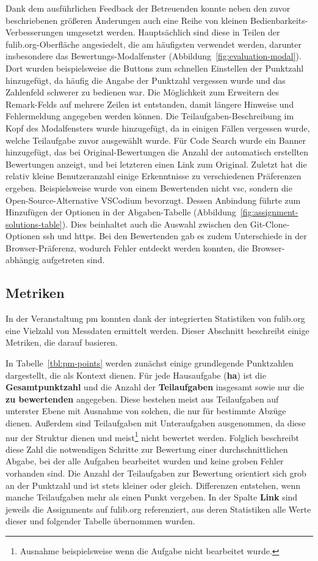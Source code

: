 Dank dem ausführlichen Feedback der Betreuenden konnte neben den zuvor beschriebenen größeren Änderungen auch eine Reihe von kleinen Bedienbarkeits-Verbesserungen umgesetzt werden.
Hauptsächlich sind diese in Teilen der fulib.org-Oberfläche angesiedelt, die am häufigsten verwendet werden, darunter insbesondere das Bewertungs-Modalfenster (Abbildung~\ref{fig:evaluation-modal}).
Dort wurden beispielsweise die Buttons zum schnellen Einstellen der Punktzahl hinzugefügt, da häufig die Angabe der Punktzahl vergessen wurde und das Zahlenfeld schwerer zu bedienen war.
Die Möglichkeit zum Erweitern des Remark-Felds auf mehrere Zeilen ist entstanden, damit längere Hinweise und Fehlermeldung angegeben werden können.
Die Teilaufgaben-Beschreibung im Kopf des Modalfensters wurde hinzugefügt, da in einigen Fällen vergessen wurde, welche Teilaufgabe zuvor ausgewählt wurde.
Für Code Search wurde ein Banner hinzugefügt, das bei Original-Bewertungen die Anzahl der automatisch erstellten Bewertungen anzeigt, und bei letzteren einen Link zum Original.
Zuletzt hat die relativ kleine Benutzeranzahl einige Erkenntnisse zu verschiedenen Präferenzen ergeben.
Beispielsweise wurde von einem Bewertenden nicht \ac{vsc}, sondern die Open-Source-Alternative VSCodium bevorzugt.
Dessen Anbindung führte zum Hinzufügen der Optionen in der Abgaben-Tabelle (Abbildung~\ref{fig:assignment-solutions-table}).
Dies beinhaltet auch die Auswahl zwischen den Git-Clone-Optionen \ac{ssh} und \ac{https}.
Bei den Bewertenden gab es zudem Unterschiede in der Browser-Präferenz, wodurch Fehler entdeckt werden konnten, die Browser-abhängig aufgetreten sind.

\subsection{Metriken}\label{subsec:pm-metrics}

In der Veranstaltung \ac{pm} konnten dank der integrierten Statistiken von fulib.org eine Vielzahl von Messdaten ermittelt werden.
Dieser Abschnitt beschreibt einige Metriken, die darauf basieren.

In Tabelle~\ref{tbl:pm-points} werden zunächst einige grundlegende Punktzahlen dargestellt, die als Kontext dienen.
Für jede Hausaufgabe (\textbf{\acs{ha}}) ist die \textbf{Gesamtpunktzahl} und die Anzahl der \textbf{Teilaufgaben} insgesamt sowie nur die \textbf{zu bewertenden} angegeben.
Diese bestehen meist aus Teilaufgaben auf unterster Ebene mit Ausnahme von solchen, die nur für bestimmte Abzüge dienen.
Außerdem sind Teilaufgaben mit Unteraufgaben ausgenommen, da diese nur der Struktur dienen und meist\footnote{
    Ausnahme beispielsweise wenn die Aufgabe nicht bearbeitet wurde.
} nicht bewertet werden.
Folglich beschreibt diese Zahl die notwendigen Schritte zur Bewertung einer durchschnittlichen Abgabe, bei der alle Aufgaben bearbeitet wurden und keine groben Fehler vorhanden sind.
Die Anzahl der Teilaufgaben zur Bewertung orientiert sich grob an der Punktzahl und ist stets kleiner oder gleich.
Differenzen entstehen, wenn manche Teilaufgaben mehr als einen Punkt vergeben.
In der Spalte \textbf{Link} sind jeweils die Assignments auf fulib.org referenziert, aus deren Statistiken alle Werte dieser und folgender Tabelle übernommen wurden.


